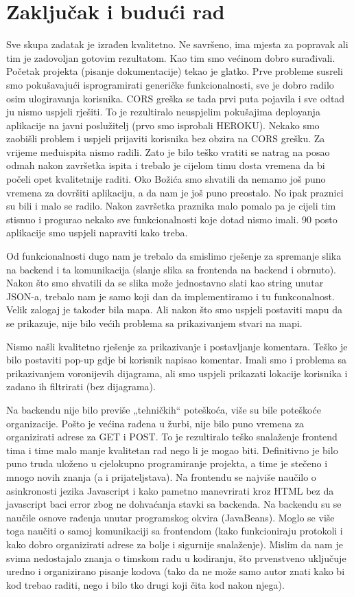 \chapter{Zaključak i budući rad}
		

	Sve skupa zadatak je izrađen kvalitetno. Ne savršeno, ima mjesta za popravak ali tim je zadovoljan gotovim rezultatom. Kao tim smo većinom dobro surađivali. Početak projekta (pisanje dokumentacije) tekao je glatko. Prve probleme susreli smo pokušavajući isprogramirati generičke funkcionalnosti, sve je dobro radilo osim ulogiravanja korisnika. CORS greška se tada prvi puta pojavila i sve odtad ju nismo uspjeli rješiti. To je rezultiralo neuspjelim pokušajima deployanja aplikacije na javni poslužitelj (prvo smo isprobali HEROKU). Nekako smo zaobišli problem i uspjeli prijaviti korisnika bez obzira na CORS grešku. Za vrijeme međuispita nismo radili. Zato je bilo teško vratiti se natrag na posao odmah nakon završetka ispita i trebalo je cijelom timu dosta vremena da bi počeli opet kvalitetnije raditi. Oko Božića smo shvatili da nemamo još puno vremena za dovršiti aplikaciju, a da nam je još puno preostalo. No ipak praznici su bili i malo se radilo. Nakon završetka praznika malo pomalo pa je cijeli tim stisnuo i progurao nekako sve funkcionalnosti koje dotad nismo imali. 90 posto aplikacije smo uspjeli napraviti kako treba. \par
	Od funkcionalnosti dugo nam je trebalo da smislimo rješenje za spremanje slika na backend i ta komunikacija (slanje slika sa frontenda na backend i obrnuto). Nakon što smo shvatili da se slika može jednostavno slati kao string unutar JSON-a, trebalo nam je samo koji dan da implementiramo i tu funkconalnost. Velik zalogaj je također bila mapa. Ali nakon što smo uspjeli postaviti mapu da se prikazuje, nije bilo većih problema sa prikazivanjem stvari na mapi. \par
	Nismo našli kvalitetno rješenje za prikazivanje i postavljanje komentara. Teško je bilo postaviti pop-up gdje bi korisnik napisao komentar. Imali smo i problema sa prikazivanjem voronijevih dijagrama, ali smo uspjeli prikazati lokacije korisnika i zadano ih filtrirati (bez dijagrama). \par
	Na backendu nije bilo previše „tehničkih“ poteškoća, više su bile poteškoće organizacije. Pošto je većina rađena u žurbi, nije bilo puno vremena za organizirati adrese za GET i POST. To je rezultiralo teško snalaženje frontend tima i time malo manje kvalitetan rad nego li je mogao biti. Definitivno je bilo puno truda uloženo u cjelokupno programiranje projekta, a time je stečeno i mnogo novih znanja (a i prijateljstava). Na frontendu se najviše naučilo o asinkronosti jezika Javascript i kako pametno manevrirati kroz HTML bez da javascript baci error zbog ne dohvaćanja stavki sa backenda. Na backendu su se naučile osnove rađenja unutar programskog okvira (JavaBeans). Moglo se više toga naučiti o samoj komunikaciji sa frontendom (kako funkcioniraju protokoli i kako dobro organizirati adrese za bolje i sigurnije snalaženje). Mislim da nam je svima nedostajalo znanja o timskom radu u kodiranju, što prvenstveno uključuje uredno i organizirano pisanje kodova (tako da ne može samo autor znati kako bi kod trebao raditi, nego i bilo tko drugi koji čita kod nakon njega). \par
